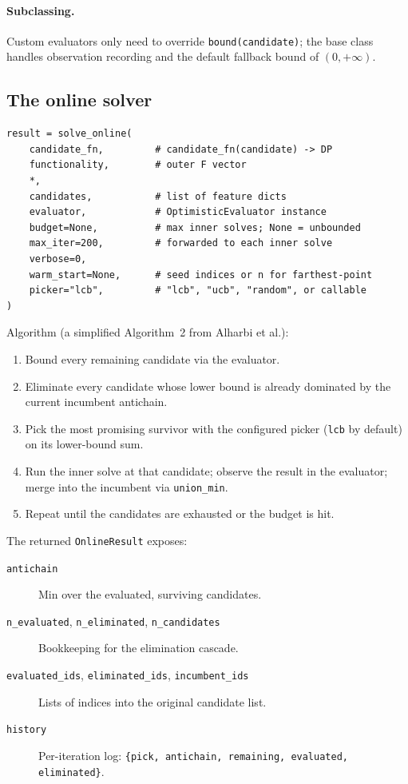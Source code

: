 \documentclass[11pt,a4paper]{article}
\begin{document}
\paragraph{Subclassing.} Custom evaluators only need to override
\texttt{bound(candidate)}; the base class handles observation
recording and the default fallback bound of $(0, +\infty)$.

\subsection{The online solver}

\begin{lstlisting}
result = solve_online(
    candidate_fn,         # candidate_fn(candidate) -> DP
    functionality,        # outer F vector
    *,
    candidates,           # list of feature dicts
    evaluator,            # OptimisticEvaluator instance
    budget=None,          # max inner solves; None = unbounded
    max_iter=200,         # forwarded to each inner solve
    verbose=0,
    warm_start=None,      # seed indices or n for farthest-point
    picker="lcb",         # "lcb", "ucb", "random", or callable
)
\end{lstlisting}

Algorithm (a simplified Algorithm~2 from Alharbi et al.):
\begin{enumerate}
\item Bound every remaining candidate via the evaluator.
\item Eliminate every candidate whose lower bound is already
  dominated by the current incumbent antichain.
\item Pick the most promising survivor with the configured picker
  (\texttt{lcb} by default) on its lower-bound sum.
\item Run the inner solve at that candidate; observe the result in
  the evaluator; merge into the incumbent via \texttt{union\_min}.
\item Repeat until the candidates are exhausted or the budget is hit.
\end{enumerate}

The returned \texttt{OnlineResult} exposes:
\begin{description}
\item[\texttt{antichain}] Min over the evaluated, surviving candidates.
\item[\texttt{n\_evaluated}, \texttt{n\_eliminated},
       \texttt{n\_candidates}] Bookkeeping for the elimination cascade.
\item[\texttt{evaluated\_ids}, \texttt{eliminated\_ids},
       \texttt{incumbent\_ids}] Lists of indices into the original
  candidate list.
\item[\texttt{history}] Per-iteration log:
  \texttt{\{pick, antichain, remaining, evaluated, eliminated\}}.
\end{description}
\end{document}
